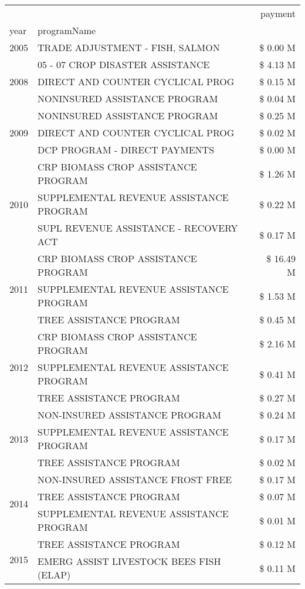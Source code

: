 \begin{tabular}{llr}
\toprule
 &  & payment \\
year & programName &  \\
\midrule
2005 & TRADE ADJUSTMENT - FISH, SALMON & \$ 0.00 M \\
\cline{1-3}
\multirow[t]{3}{*}{2008} & 05 - 07 CROP DISASTER ASSISTANCE & \$ 4.13 M \\
 & DIRECT AND COUNTER CYCLICAL PROG & \$ 0.15 M \\
 & NONINSURED ASSISTANCE PROGRAM & \$ 0.04 M \\
\cline{1-3}
\multirow[t]{3}{*}{2009} & NONINSURED ASSISTANCE PROGRAM & \$ 0.25 M \\
 & DIRECT AND COUNTER CYCLICAL PROG & \$ 0.02 M \\
 & DCP PROGRAM - DIRECT PAYMENTS & \$ 0.00 M \\
\cline{1-3}
\multirow[t]{3}{*}{2010} & CRP BIOMASS CROP ASSISTANCE PROGRAM & \$ 1.26 M \\
 & SUPPLEMENTAL REVENUE ASSISTANCE PROGRAM & \$ 0.22 M \\
 & SUPL REVENUE ASSISTANCE - RECOVERY ACT & \$ 0.17 M \\
\cline{1-3}
\multirow[t]{3}{*}{2011} & CRP BIOMASS CROP ASSISTANCE PROGRAM & \$ 16.49 M \\
 & SUPPLEMENTAL REVENUE ASSISTANCE PROGRAM & \$ 1.53 M \\
 & TREE ASSISTANCE PROGRAM & \$ 0.45 M \\
\cline{1-3}
\multirow[t]{3}{*}{2012} & CRP BIOMASS CROP ASSISTANCE PROGRAM & \$ 2.16 M \\
 & SUPPLEMENTAL REVENUE ASSISTANCE PROGRAM & \$ 0.41 M \\
 & TREE ASSISTANCE PROGRAM & \$ 0.27 M \\
\cline{1-3}
\multirow[t]{3}{*}{2013} & NON-INSURED ASSISTANCE PROGRAM & \$ 0.24 M \\
 & SUPPLEMENTAL REVENUE ASSISTANCE PROGRAM & \$ 0.17 M \\
 & TREE ASSISTANCE PROGRAM & \$ 0.02 M \\
\cline{1-3}
\multirow[t]{3}{*}{2014} & NON-INSURED ASSISTANCE FROST FREE & \$ 0.17 M \\
 & TREE ASSISTANCE PROGRAM & \$ 0.07 M \\
 & SUPPLEMENTAL REVENUE ASSISTANCE PROGRAM & \$ 0.01 M \\
\cline{1-3}
\multirow[t]{3}{*}{2015} & TREE ASSISTANCE PROGRAM & \$ 0.12 M \\
 & EMERG ASSIST LIVESTOCK BEES FISH (ELAP) & \$ 0.11 M \\

\end{tabular}
